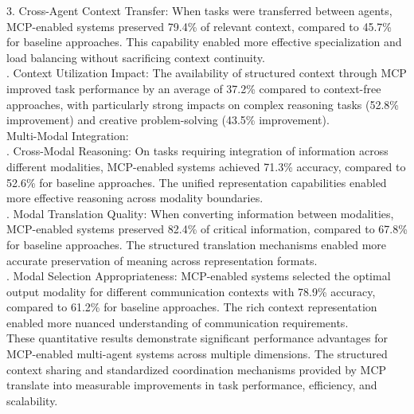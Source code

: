 3. Cross-Agent Context Transfer: When tasks were transferred between agents, MCP-enabled systems preserved 79.4\% of relevant context, compared to 45.7\% for baseline approaches. This capability enabled more effective specialization and load balancing without sacrificing context continuity.\\ . Context Utilization Impact: The availability of structured context through MCP improved task performance by an average of 37.2\% compared to context-free approaches, with particularly strong impacts on complex reasoning tasks (52.8\% improvement) and creative problem-solving (43.5\% improvement).\\ \newline
Multi-Modal Integration:\\ . Cross-Modal Reasoning: On tasks requiring integration of information across different modalities, MCP-enabled systems achieved 71.3\% accuracy, compared to 52.6\% for baseline approaches. The unified representation capabilities enabled more effective reasoning across modality boundaries.\\ . Modal Translation Quality: When converting information between modalities, MCP-enabled systems preserved 82.4\% of critical information, compared to 67.8\% for baseline approaches. The structured translation mechanisms enabled more accurate preservation of meaning across representation formats.\\ . Modal Selection Appropriateness: MCP-enabled systems selected the optimal output modality for different communication contexts with 78.9\% accuracy, compared to 61.2\% for baseline approaches. The rich context representation enabled more nuanced understanding of communication requirements.\\ \newline
These quantitative results demonstrate significant performance advantages for MCP-enabled multi-agent systems across multiple dimensions. The structured context sharing and standardized coordination mechanisms provided by MCP translate into measurable improvements in task performance, efficiency, and scalability.\\
